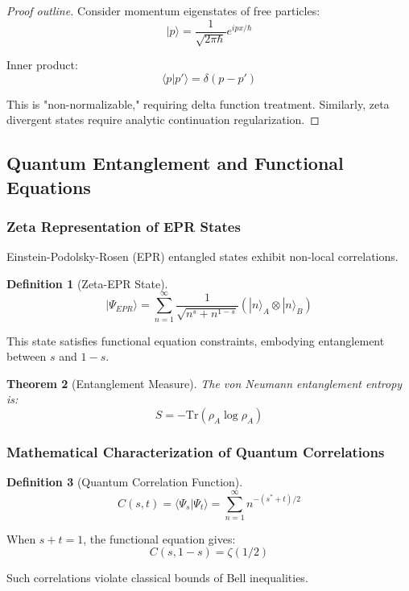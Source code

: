 \documentclass[11pt]{article}
\theoremstyle{plain}
\newtheorem{theorem}{Theorem}[section]
\theoremstyle{definition}
\newtheorem{definition}[theorem]{Definition}
\theoremstyle{remark}
\begin{document}
\begin{proof}[Proof outline]
Consider momentum eigenstates of free particles:
$$|p\rangle = \frac{1}{\sqrt{2\pi\hbar}} e^{ipx/\hbar}$$

Inner product:
$$\langle p|p' \rangle = \delta(p-p')$$

This is "non-normalizable," requiring delta function treatment. Similarly, zeta divergent states require analytic continuation regularization.
\end{proof}

\subsection{Quantum Entanglement and Functional Equations}

\subsubsection{Zeta Representation of EPR States}

Einstein-Podolsky-Rosen (EPR) entangled states exhibit non-local correlations.

\begin{definition}[Zeta-EPR State]
$$|\Psi_{EPR}\rangle = \sum_{n=1}^{\infty} \frac{1}{\sqrt{n^s + n^{1-s}}} \left(|n\rangle_A \otimes |n\rangle_B\right)$$
\end{definition}

This state satisfies functional equation constraints, embodying entanglement between $s$ and $1-s$.

\begin{theorem}[Entanglement Measure]
The von Neumann entanglement entropy is:
$$S = -\text{Tr}(\rho_A \log \rho_A)$$
\end{theorem}

\subsubsection{Mathematical Characterization of Quantum Correlations}

\begin{definition}[Quantum Correlation Function]
$$C(s,t) = \langle \Psi_s | \Psi_t \rangle = \sum_{n=1}^{\infty} n^{-(s^*+t)/2}$$
\end{definition}

When $s + t = 1$, the functional equation gives:
$$C(s,1-s) = \zeta(1/2)$$

Such correlations violate classical bounds of Bell inequalities.
\end{document}
